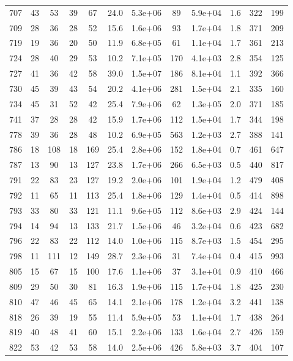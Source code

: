 \begin{table}
\begin{tabular}{cccccccccccc}
707 & 43 & 53 & 39 & 67 & 24.0 & 5.3e+06 & 89 & 5.9e+04 & 1.6 & 322 & 199 \\
709 & 28 & 36 & 28 & 52 & 15.6 & 1.6e+06 & 93 & 1.7e+04 & 1.8 & 371 & 209 \\
719 & 19 & 36 & 20 & 50 & 11.9 & 6.8e+05 & 61 & 1.1e+04 & 1.7 & 361 & 213 \\
724 & 28 & 40 & 29 & 53 & 10.2 & 7.1e+05 & 170 & 4.1e+03 & 2.8 & 354 & 125 \\
727 & 41 & 36 & 42 & 58 & 39.0 & 1.5e+07 & 186 & 8.1e+04 & 1.1 & 392 & 366 \\
730 & 45 & 39 & 43 & 54 & 20.2 & 4.1e+06 & 281 & 1.5e+04 & 2.1 & 335 & 160 \\
734 & 45 & 31 & 52 & 42 & 25.4 & 7.9e+06 & 62 & 1.3e+05 & 2.0 & 371 & 185 \\
741 & 37 & 28 & 28 & 42 & 15.9 & 1.7e+06 & 112 & 1.5e+04 & 1.7 & 344 & 198 \\
778 & 39 & 36 & 28 & 48 & 10.2 & 6.9e+05 & 563 & 1.2e+03 & 2.7 & 388 & 141 \\
786 & 18 & 108 & 18 & 169 & 25.4 & 2.8e+06 & 152 & 1.8e+04 & 0.7 & 461 & 647 \\
787 & 13 & 90 & 13 & 127 & 23.8 & 1.7e+06 & 266 & 6.5e+03 & 0.5 & 440 & 817 \\
791 & 22 & 83 & 23 & 127 & 19.2 & 2.0e+06 & 101 & 1.9e+04 & 1.2 & 479 & 408 \\
792 & 11 & 65 & 11 & 113 & 25.4 & 1.8e+06 & 129 & 1.4e+04 & 0.5 & 414 & 898 \\
793 & 33 & 80 & 33 & 121 & 11.1 & 9.6e+05 & 112 & 8.6e+03 & 2.9 & 424 & 144 \\
794 & 14 & 94 & 13 & 133 & 21.7 & 1.5e+06 & 46 & 3.2e+04 & 0.6 & 423 & 682 \\
796 & 22 & 83 & 22 & 112 & 14.0 & 1.0e+06 & 115 & 8.7e+03 & 1.5 & 454 & 295 \\
798 & 11 & 111 & 12 & 149 & 28.7 & 2.3e+06 & 31 & 7.4e+04 & 0.4 & 415 & 993 \\
805 & 15 & 67 & 15 & 100 & 17.6 & 1.1e+06 & 37 & 3.1e+04 & 0.9 & 410 & 466 \\
809 & 29 & 50 & 30 & 81 & 16.3 & 1.9e+06 & 115 & 1.7e+04 & 1.8 & 425 & 230 \\
810 & 47 & 46 & 45 & 65 & 14.1 & 2.1e+06 & 178 & 1.2e+04 & 3.2 & 441 & 138 \\
818 & 26 & 39 & 19 & 55 & 11.4 & 5.9e+05 & 53 & 1.1e+04 & 1.7 & 438 & 264 \\
819 & 40 & 48 & 41 & 60 & 15.1 & 2.2e+06 & 133 & 1.6e+04 & 2.7 & 426 & 159 \\
822 & 53 & 42 & 53 & 58 & 14.0 & 2.5e+06 & 426 & 5.8e+03 & 3.7 & 404 & 107 \\

\end{tabular}
\end{table}
